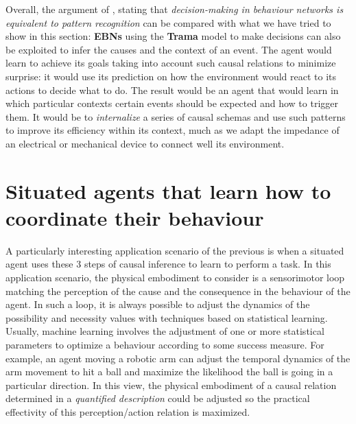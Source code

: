 \documentclass[
		twoside,openright,titlepage,numbers=noenddot,manychapters,
		headinclude,%
                footinclude=false,cleardoublepage=empty,
                BCOR=5mm,
		fontsize=11pt, %
                 enabledeprecatedfontcommands]{scrreprt}
\begin{document}
Overall, the argument of \cite{goetz1998arb}, stating that  \emph{decision-making in behaviour networks is equivalent to pattern recognition} can be compared with what we have tried to show in this section: \textbf{EBNs} using the \textbf{Trama} model to make decisions can also be exploited to infer the causes and the context of an event. The agent would learn to achieve its goals taking into account such causal relations to minimize surprise: it would use its prediction on how the environment would react to its actions to decide what to do. The result would be an agent that would learn in which particular contexts certain events should be expected and how to trigger them. It would be to \emph{internalize} a series of causal schemas and use such patterns to improve its efficiency within its context, much as we adapt the impedance of an electrical or mechanical device to connect well its environment.


\section[Situated agents that learn to coordinate behaviour]{Situated agents that learn how to coordinate their behaviour}
\label{coord_agents}
\label{learningrobots}


A particularly interesting application scenario of the previous is when a situated agent uses these 3 steps of causal inference to learn to perform a task. In this application scenario, the physical embodiment to consider is a sensorimotor loop matching the perception of the cause and the consequence in the behaviour of the agent. In such a loop, it is always possible to adjust the dynamics of the possibility and necessity values with techniques based on statistical learning. Usually, machine learning involves the adjustment of one or more statistical parameters to optimize a behaviour according to some success measure. For example, an agent moving a robotic arm can adjust the temporal dynamics of the arm movement to hit a ball and maximize the likelihood the ball is going in a particular direction. In this view, the physical embodiment of a causal relation determined in a \emph{quantified description} could be adjusted so the practical effectivity of this perception/action relation is maximized. 
\end{document}
